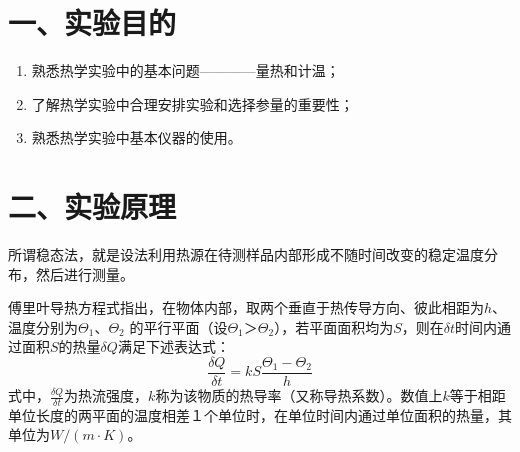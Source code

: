 \documentclass[11pt,a4paper,oneside]{article}
\begin{document}
\section*{一、实验目的}
\begin{enumerate}
\item 熟悉热学实验中的基本问题————量热和计温；
\item 了解热学实验中合理安排实验和选择参量的重要性；
\item 熟悉热学实验中基本仪器的使用。
\end{enumerate}

\section*{二、实验原理}
所谓稳态法，就是设法利用热源在待测样品内部形成不随时间改变的稳定温度分布，然后进行测量。

傅里叶导热方程式指出，在物体内部，取两个垂直于热传导方向、彼此相距为$h$、温度分别为$\Theta _1$、$\Theta _2$ 的平行平面（设$\Theta _1$＞$\Theta _2$），若平面面积均为$S$，则在$\delta t$时间内通过面积$S$的热量$\delta Q$满足下述表达式：
$$ \displaystyle\frac{\delta Q}{\delta t}=kS\displaystyle\frac{\Theta _1-\Theta _2}{h} $$
式中，$ \displaystyle\frac{\delta Q}{\delta t}$为热流强度，$k$称为该物质的热导率（又称导热系数）。数值上$k$等于相距单位长度的两平面的温度相差１个单位时，在单位时间内通过单位面积的热量，其单位为$ W/(m\cdot K)$。
\end{document}

